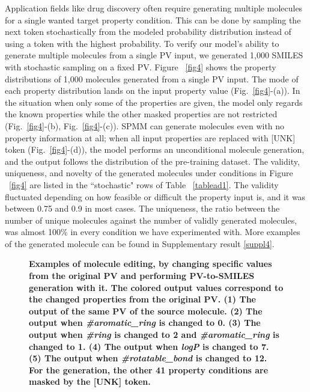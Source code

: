 \documentclass{nature_meth}
\newcommand{\1}{\blmath{1}}
\newcommand{\0}{\blmath{0}}
\begin{document}
Application fields like drug discovery often require generating multiple molecules for a single wanted target property condition. This can be done by sampling the next token stochastically from the modeled probability distribution instead of using a token with the highest probability. To verify our model's ability to generate multiple molecules from a single PV input, we generated 1,000 SMILES with stochastic sampling on a fixed PV.
Figure ~\ref{fig4} shows the property distributions of 1,000 molecules generated from a single PV input. The mode of each property distribution lands on the input property value (Fig.~\ref{fig4}-(a)). In the situation when only some of the properties are given, the model only regards the known properties while the other masked properties are not restricted (Fig.~\ref{fig4}-(b), Fig.~\ref{fig4}-(c)). SPMM can generate molecules even with no property information at all; when all input properties are replaced with [UNK] token (Fig.~\ref{fig4}-(d)), the model performs an unconditional molecule generation, and the output follows the distribution of the pre-training dataset. The validity, uniqueness, and novelty of the generated molecules under conditions in Figure ~\ref{fig4} are listed in the ``stochastic" rows of Table ~\ref{tablead1}. The validity fluctuated depending on how feasible or difficult the property input is, and it was between 0.75 and 0.9 in most cases. The uniqueness, the ratio between the number of unique molecules against the number of validly generated molecules, was almost 100\% in every condition we have experimented with. More examples of the generated molecule can be found in Supplementary result \ref{suppl4}.


\begin{figure}[!t]
	\centering
 \centerline{}
	\caption{\bf\footnotesize 
Examples of molecule editing, by changing specific values from the original PV and performing PV-to-SMILES generation with it. The colored output values correspond to the changed properties from the original PV. (1) The output of the same PV of the source molecule. (2) The output when \emph{\#aromatic\_ring} is changed to 0. (3) The output when \emph{\#ring} is changed to 2 and \emph{\#aromatic\_ring} is changed to 1. (4) The output when \emph{logP} is changed to 7. (5) The output when \emph{\#rotatable\_bond} is changed to 12. For the  generation, the other 41 property conditions are masked by the [UNK] token.
}
	\label{fig3}
\end{figure}
\end{document}
